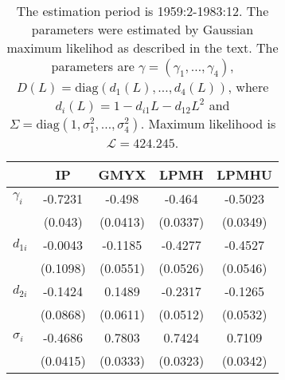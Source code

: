 \begin{table}[h!]
\centering\captionsetup{width=0.6\textwidth, font=small}
\caption{The estimation period is 1959:2-1983:12. The parameters were estimated by Gaussian maximum likelihod as described in the text. The parameters are $\gamma = (\gamma_1,\ldots, \gamma_4)$, $D(L)=\text{diag}\left(d_1(L),\ldots, d_4(L)\right)$, where $d_i(L) = 1-d_{i1}L - d_{12}L^2$ and $\Sigma = \text{diag} \left(1,\sigma_1^2,\ldots,\sigma_4^2\right)$. Maximum likelihood is $\mathcal{L}=424.245$.}\label{tab:ml-params1}
\begin{tabular}{l|cccc}
&IP&GMYX&LPMH&LPMHU\\\hline\hline
$\gamma_i$&-0.7231&-0.498&-0.464&-0.5023\\
&(0.043)&(0.0413)&(0.0337)&(0.0349)\\
$d_{1i}$&-0.0043&-0.1185&-0.4277&-0.4527\\
&(0.1098)&(0.0551)&(0.0526)&(0.0546)\\
$d_{2i}$&-0.1424&0.1489&-0.2317&-0.1265\\
&(0.0868)&(0.0611)&(0.0512)&(0.0532)\\
$\sigma_i$&-0.4686&0.7803&0.7424&0.7109\\&(0.0415)&(0.0333)&(0.0323)&(0.0342)\\\hline\hline
\end{tabular}
\end{table}